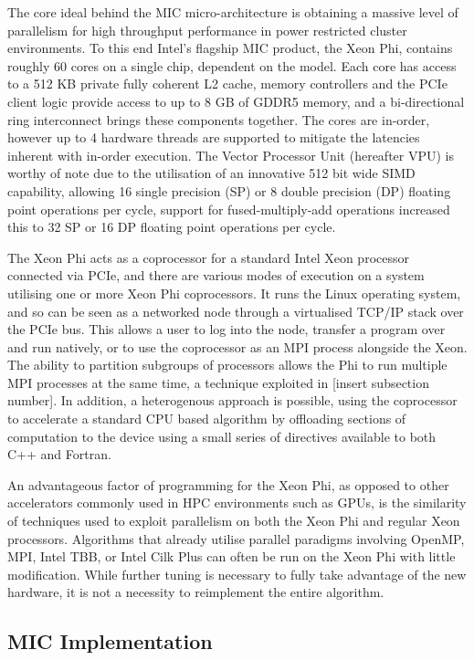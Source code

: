 \documentclass[runningheads,a4paper]{llncs}
\begin{document}
The core ideal behind the MIC micro-architecture is obtaining a massive level of parallelism for high throughput 
performance in power restricted cluster environments. To this end Intel's flagship MIC product, the Xeon Phi, 
contains roughly 60 cores on a single chip, dependent on the model. Each core has access to a 512 KB private 
fully coherent L2 cache, memory controllers and the PCIe client logic provide access to up to 8 GB of GDDR5 
memory, and a bi-directional ring interconnect brings these components together. The cores are in-order, however 
up to 4 hardware threads are supported to mitigate the latencies inherent with in-order execution. The Vector 
Processor Unit (hereafter VPU) is worthy of note due to the utilisation of an innovative 512 bit wide SIMD 
capability, allowing 16 single precision (SP) or 8 double precision (DP) floating point operations per cycle, 
support for fused-multiply-add operations increased this to 32 SP or 16 DP floating point operations per cycle. 

The Xeon Phi acts as a coprocessor for a standard Intel Xeon processor connected via PCIe, and there are various 
modes of execution on a system utilising one or more Xeon Phi coprocessors. It runs the Linux operating system, 
and so can be seen as a networked node through a virtualised TCP/IP stack over the PCIe bus. This allows a user 
to log into the node, transfer a program over and run natively, or to use the coprocessor as an MPI process alongside 
the Xeon. The ability to partition subgroups of processors allows the Phi to run multiple MPI processes at the same 
time, a technique exploited in [insert subsection number]. In addition, a heterogenous approach is possible, using 
the coprocessor to accelerate a standard CPU based algorithm by offloading sections of computation to the device using 
a small series of directives available to both C++ and Fortran. 

An advantageous factor of programming for the Xeon Phi, as opposed to other accelerators commonly used in HPC 
environments such as GPUs, is the similarity of techniques used to exploit parallelism on both the Xeon Phi and 
regular Xeon processors. Algorithms that already utilise parallel paradigms involving OpenMP, MPI, Intel TBB, or 
Intel Cilk Plus can often be run on the Xeon Phi with little modification. While further tuning is necessary to 
fully take advantage of the new hardware, it is not a necessity to reimplement the entire algorithm.   


\subsection{MIC Implementation}
\label{sect:micimplementation}
\end{document}
